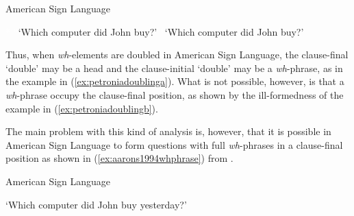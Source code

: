 \begin{exe}
\ex American Sign Language \citep[33]{petronio1997}\label{petroniadoubling}\begin{xlist}
\ex \textcolor{white}{*}
\glt \textcolor{white}{*}`Which computer did John buy?' \label{ex:petroniadoublinga}
\ex *
\glt \textcolor{white}{*}`Which computer did John buy?' \label{ex:petroniadoublingb}
\end{xlist}
\end{exe}

\noindent Thus, when \textit{wh}-elements are doubled in American Sign Language, the clause-final `double' may be a head and the clause-initial `double' may be a \textit{wh}-phrase, as in the example in (\ref{ex:petroniadoublinga}). What is not possible, however, is that a \textit{wh}-phrase occupy the clause-final position, as shown by the ill-formedness of the example in (\ref{ex:petroniadoublingb}).

The main problem with this kind of analysis is, however, that it is possible in American Sign Language to form questions with full \textit{wh}-phrases in a clause-final position as shown in (\ref{ex:aarons1994whphrase}) from \citet[92]{aarons1994aspects}.

\begin{exe}
\ex American Sign Language \citep[92]{aarons1994aspects} \\  

\glt `Which computer did John buy yesterday?' \label{ex:aarons1994whphrase}
\end{exe}

